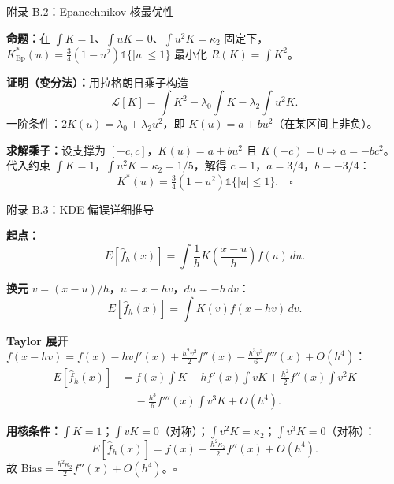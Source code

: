 \documentclass[aspectratio=169, 10pt]{beamer}
\begin{document}
\begin{frame}{附录 B.2：Epanechnikov 核最优性}
  \hypertarget{proof-b2}{}

  \textbf{命题：}在 $\int K = 1$、$\int uK = 0$、$\int u^2 K = \kappa_2$ 固定下，$K^*_{\text{Ep}}(u) = \tfrac{3}{4}(1-u^2)\mathds{1}\{|u|\leq 1\}$ 最小化 $R(K) = \int K^2$。

  \textbf{证明（变分法）：}用拉格朗日乘子构造
  \[
    \mathcal{L}[K] = \int K^2 - \lambda_0\!\int K - \lambda_2\!\int u^2 K.
  \]
  一阶条件：$2K(u) = \lambda_0 + \lambda_2 u^2$，即 $K(u) = a + b u^2$（在某区间上非负）。

  \textbf{求解乘子：}设支撑为 $[-c, c]$，$K(u) = a + bu^2$ 且 $K(\pm c) = 0 \Rightarrow a = -bc^2$。
  代入约束 $\int K = 1$，$\int u^2 K = \kappa_2 = 1/5$，解得 $c = 1$，$a = 3/4$，$b = -3/4$：
  \[
    K^*(u) = \tfrac{3}{4}(1-u^2)\mathds{1}\{|u|\leq 1\}. \quad\square
  \]

  \vspace{0.5em}
  \hfill{\scriptsize\hyperlink{main-b2}{}}
\end{frame}


\begin{frame}{附录 B.3：KDE 偏误详细推导}
  \hypertarget{proof-b3}{}

  \textbf{起点：}
  \[
    E[\hat f_h(x)] = \int \frac{1}{h}K\!\left(\frac{x-u}{h}\right) f(u)\,du.
  \]

  \textbf{换元} $v = (x-u)/h$，$u = x - hv$，$du = -h\,dv$：
  \[
    E[\hat f_h(x)] = \int K(v) f(x - hv)\,dv.
  \]

  \textbf{Taylor 展开} $f(x-hv) = f(x) - hv f'(x) + \tfrac{h^2 v^2}{2}f''(x) - \tfrac{h^3 v^3}{6}f'''(x) + O(h^4)$：
  \begin{align*}
    E[\hat f_h(x)] &= f(x)\!\int K - h f'(x)\!\int vK + \tfrac{h^2}{2}f''(x)\!\int v^2 K \\
    &\quad\ - \tfrac{h^3}{6}f'''(x)\!\int v^3 K + O(h^4).
  \end{align*}

  \textbf{用核条件：}$\int K = 1$；$\int vK = 0$（对称）；$\int v^2 K = \kappa_2$；$\int v^3 K = 0$（对称）：
  \[
    E[\hat f_h(x)] = f(x) + \tfrac{h^2\kappa_2}{2}f''(x) + O(h^4).
  \]
  故 $\text{Bias} = \tfrac{h^2\kappa_2}{2}f''(x) + O(h^4)$。$\square$

  \vspace{0.5em}
  \hfill{\scriptsize\hyperlink{main-b3}{}}
\end{frame}
\end{document}
